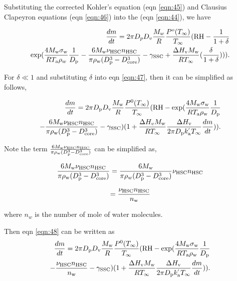 \documentclass[12pt]{article}
\begin{document}
Substituting the corrected Kohler's equation (eqn \ref{eqn:45}) and Clausius Clapeyron equations (eqn \ref{eqn:46}) into the (eqn \ref{eqn:44}), we have

\begin{eqnarray}\label{eqn:47}
\frac{dm}{dt}=2 \pi D_{p} D_{v}  \frac{M_{w}}{R} \frac{P^{o}(T_{\infty})} {T_{\infty}} (\textrm{RH} - \frac{1}{1+\delta}  \\ \nonumber
\exp( \frac{4 M_{\rm w}\sigma_{\rm w}}{R T_{\rm a} \rho_w}\frac{1}{D_{\rm p}}-\frac{6M_{\rm w}\nu_{\rm HSC}n_{\rm HSC}}{\pi \rho_{\rm w}(D_{\rm p}^{3}-D_{\rm core}^{3})}-\gamma_{\rm SSC}+\frac{\Delta H_{\rm v} M_{\rm w}}{R T_{\infty}} (\frac{\delta}{1+\delta}))).  \nonumber
\end{eqnarray}

For $\delta \ll 1$ and substituting $\delta$ into eqn \ref{eqn:47}, then it  can be simplified as follows, 

\begin{eqnarray}\label{eqn:48}
\frac{dm}{dt}=2 \pi D_{\rm p} D_{\rm v}  \frac{M_{\rm w}}{R} \frac{P^{\rm 0}(T_{\infty})} {T_{\infty}} (\textrm{RH} - \exp( \frac{4 M_{\rm w}\sigma_{\rm w}}{R T_{\rm a} 
\rho_{\rm w}} \frac{1}{D_{\rm p}}\\ \nonumber 
-\frac{6M_{\rm w}\nu_{\rm HSC}n_{\rm HSC}}{\pi \rho_{\rm w}(D_{\rm p}^{3}-D_{\rm core}^{3})}-\gamma_{\rm SSC})(1+\frac{\Delta H_{v} M_{\rm w}}{R T_{\infty}} \frac{\Delta H_{\rm v}}{2 \pi D_{\rm p} k^{'}_{\rm a} T_{\infty}} \frac{dm}{dt})). \nonumber
\end{eqnarray}

Note the term $\frac{6M_{\rm w}\nu_{\rm HSC}n_{\rm HSC}}{\pi \rho_{\rm w}(D_{\rm p}^{3}-D_{\rm core}^{3})}$ can be simplified as,

\begin{equation}\label{eqn:49}
\frac{6M_{\rm w}\nu_{\rm HSC}n_{\rm HSC}}{\pi \rho_{\rm w}(D_{\rm p}^{3}-D_{\rm core}^{3})}=\frac{6M_{\rm w}}{\pi \rho_{w}(D_{\rm p}^{3}-D_{\rm core}^{3})}\nu_{\rm HSC}n_{\rm HSC}
\end{equation}

\begin{equation}\label{eqn:50}
=\frac{\nu_{\rm HSC}n_{\rm HSC}}{n_{\rm w}}
\end{equation}

where $n_{w}$ is the number of mole of water molecules. 

Then eqn \ref{eqn:48} can be written as 
\begin{eqnarray}\label{eqn:51}
\frac{dm}{dt}=2 \pi D_{\rm p} D_{\rm v}  \frac{M_{\rm w}}{R} \frac{P^{\rm 0}(T_{\infty})} {T_{\infty}} 
(\textrm{RH} - \exp( \frac{4 M_{\rm w} \sigma_{\rm w}}{R T_{\rm a} \rho_{\rm w}} \frac{1}{D_{\rm p}}\\ \nonumber
-\frac{\nu_{\rm HSC}n_{\rm HSC}}{n_{\rm w}}-\gamma_{\rm SSC})(1+\frac{\Delta H_{\rm v} M_{\rm w}}{R T_{\infty}} \frac{\Delta H_{\rm v}}{2 \pi D_{\rm p} k^{'}_{\rm a} T_{\infty}} \frac{dm}{dt})). \nonumber
\end{eqnarray}
\end{document}
